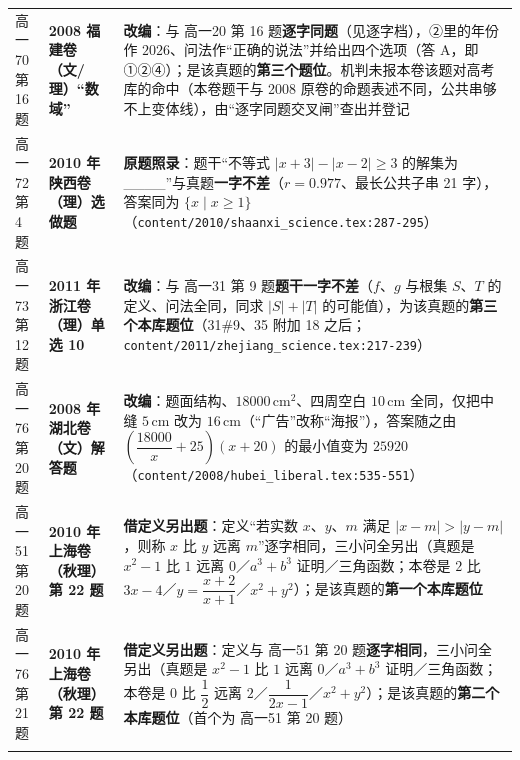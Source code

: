 \documentclass[a4paper,11pt]{article}
\begin{document}
\begin{xltabular}{\textwidth}{@{}>{\raggedright\arraybackslash}p{2.85cm}>{\raggedright\arraybackslash}p{3.99cm}>{\raggedright\arraybackslash}p{7.89cm}@{}}
高一70 第 16 题 & \textbf{2008 福建卷（文/理）``数域''} & \textbf{改编}：与 高一20 第 16 题\textbf{逐字同题}（见逐字档），②里的年份作 \(2026\)、问法作``正确的说法''并给出四个选项（答 A，即 ①②④）；是该真题的\textbf{第三个题位}。机判未报本卷该题对高考库的命中（本卷题干与 2008 原卷的命题表述不同，公共串够不上变体线），由``逐字同题交叉闸''查出并登记 \\ \addlinespace[1pt]
高一72 第 4 题 & \textbf{2010 年陕西卷（理）选做题} & \textbf{原题照录}：题干``不等式 \(\lvert x+\allowbreak 3\rvert-\lvert x-2\rvert\geqslant\allowbreak 3\) 的解集为 \_\_\_\_''与真题\textbf{一字不差}（\(r=\allowbreak 0.977\)、最长公共子串 21 字），答案同为 \(\{x\mid\allowbreak  x\geqslant\allowbreak 1\}\)（\texttt{content/\allowbreak{}2010/\allowbreak{}shaanxi\_science.tex:287-\allowbreak{}295}） \\ \addlinespace[1pt]
高一73 第 12 题 & \textbf{2011 年浙江卷（理）单选 10} & \textbf{改编}：与 高一31 第 9 题\textbf{题干一字不差}（\(f\)、\(g\) 与根集 \(S\)、\(T\) 的定义、问法全同，同求 \(\lvert S\rvert+\allowbreak \lvert T\rvert\) 的可能值），为该真题的\textbf{第三个本库题位}（31\#9、35 附加 18 之后；\texttt{content/\allowbreak{}2011/\allowbreak{}zhejiang\_science.tex:217-\allowbreak{}239}） \\ \addlinespace[1pt]
高一76 第 20 题 & \textbf{2008 年湖北卷（文）解答题} & \textbf{改编}：题面结构、\(18000\,\allowbreak \mathrm{cm}^2\)、四周空白 \(10\,\allowbreak \mathrm{cm}\) 全同，仅把中缝 \(5\,\allowbreak \mathrm{cm}\) 改为 \(16\,\allowbreak \mathrm{cm}\)（``广告''改称``海报''），答案随之由 \(\left(\dfrac{18000}{x}+\allowbreak 25\right)(x+\allowbreak 20)\) 的最小值变为 \(25920\)（\texttt{content/\allowbreak{}2008/\allowbreak{}hubei\_liberal.tex:535-\allowbreak{}551}） \\ \addlinespace[1pt]
高一51 第 20 题 & \textbf{2010 年上海卷（秋理）第 22 题} & \textbf{借定义另出题}：定义``若实数 \(x\)、\(y\)、\(m\) 满足 \(\lvert x-m\rvert>\lvert y-m\rvert\)，则称 \(x\) 比 \(y\) 远离 \(m\)''逐字相同，三小问全另出（真题是 \(x^2-1\) 比 \(1\) 远离 \(0\)／\(a^3+b^3\) 证明／三角函数；本卷是 \(2\) 比 \(3x-4\)／\(y=\allowbreak \dfrac{x+\allowbreak 2}{x+\allowbreak 1}\)／\(x^2+y^2\)）；是该真题的\textbf{第一个本库题位} \\ \addlinespace[1pt]
高一76 第 21 题 & \textbf{2010 年上海卷（秋理）第 22 题} & \textbf{借定义另出题}：定义与 高一51 第 20 题\textbf{逐字相同}，三小问全另出（真题是 \(x^2-1\) 比 \(1\) 远离 \(0\)／\(a^3+b^3\) 证明／三角函数；本卷是 \(0\) 比 \(\dfrac12\) 远离 \(2\)／\(\dfrac1{2x-1}\)／\(x^2+y^2\)）；是该真题的\textbf{第二个本库题位}（首个为 高一51 第 20 题） \\ \addlinespace[1pt]

\end{xltabular}
\end{document}
